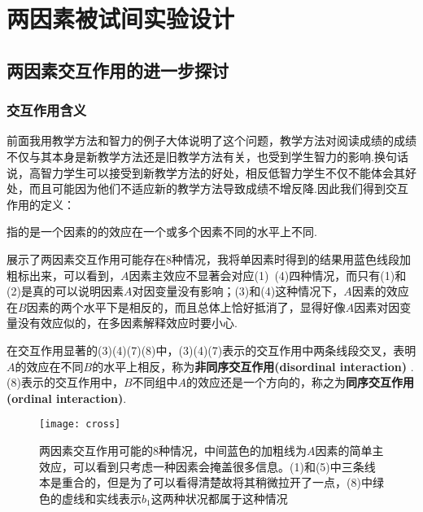 \setchapterpreamble[u]{\margintoc}
\chapter{两因素被试间实验设计}

%
%

\section{两因素交互作用的进一步探讨}

\subsection{交互作用含义}

前面我用教学方法和智力的例子大体说明了这个问题，教学方法对阅读成绩的成绩不仅与其本身是新教学方法还是旧教学方法有关，也受到学生智力的影响.换句话说，高智力学生可以接受到新教学方法的好处，相反低智力学生不仅不能体会其好处，而且可能因为他们不适应新的教学方法导致成绩不增反降.因此我们得到交互作用的定义：

\begin{definition}[交互作用]
    指的是一个因素的的效应在一个或多个因素不同的水平上不同.
\end{definition}

展示了两因素交互作用可能存在8种情况，我将单因素时得到的结果用蓝色线段加粗标出来，可以看到，$A$因素主效应不显著会对应(1)~(4)四种情况，而只有(1)和(2)是真的可以说明因素$A$对因变量没有影响；(3)和(4)这种情况下，$A$因素的效应在$B$因素的两个水平下是相反的，而且总体上恰好抵消了，显得好像$A$因素对因变量没有效应似的，在多因素解释效应时要小心.

在交互作用显著的(3)(4)(7)(8)中，(3)(4)(7)表示的交互作用中两条线段交叉，表明$A$的效应在不同$B$的水平上相反，称为\textbf{非同序交互作用(disordinal interaction)}
.
(8)表示的交互作用中，$B$不同组中$A$的效应还是一个方向的，称之为\textbf{同序交互作用(ordinal interaction)}.

\begin{figure*}
    \texttt{[image: cross]}
    \caption{两因素交互作用可能的8种情况，中间蓝色的加粗线为$A$因素的简单主效应，可以看到只考虑一种因素会掩盖很多信息。(1)和(5)中三条线本是重合的，但是为了可以看得清楚故将其稍微拉开了一点，(8)中绿色的虚线和实线表示$b_1$这两种状况都属于这种情况}
\end{figure*}

